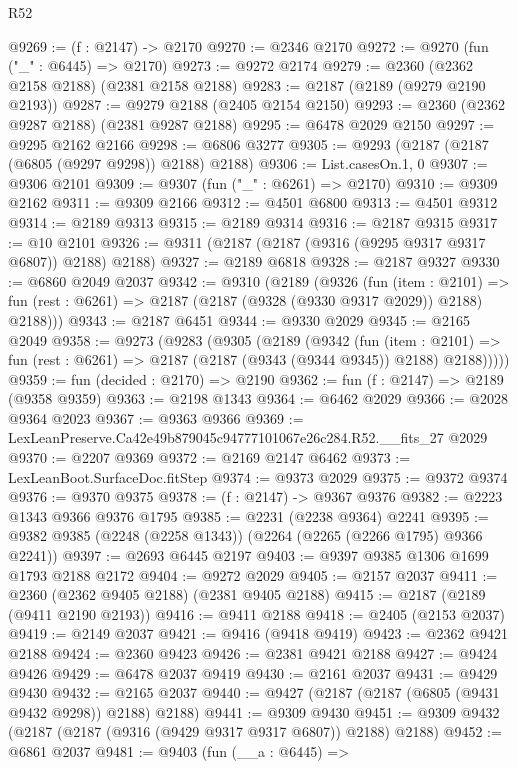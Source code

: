 \begin{lexlean}{R52}
\begin{coremodule}
@9269 := (f : @2147) -> @2170
@9270 := @2346 @2170
@9272 := @9270 (fun ("_" : @6445) => @2170)
@9273 := @9272 @2174
@9279 := @2360 (@2362 @2158 @2188) (@2381 @2158 @2188)
@9283 := @2187 (@2189 (@9279 @2190 @2193))
@9287 := @9279 @2188 (@2405 @2154 @2150)
@9293 := @2360 (@2362 @9287 @2188) (@2381 @9287 @2188)
@9295 := @6478 @2029 @2150
@9297 := @9295 @2162 @2166
@9298 := @6806 @3277
@9305 := @9293 (@2187 (@2187 (@6805 (@9297 @9298)) @2188) @2188)
@9306 := List.casesOn.{1, 0}
@9307 := @9306 @2101
@9309 := @9307 (fun ("_" : @6261) => @2170)
@9310 := @9309 @2162
@9311 := @9309 @2166
@9312 := @4501 @6800
@9313 := @4501 @9312
@9314 := @2189 @9313
@9315 := @2189 @9314
@9316 := @2187 @9315
@9317 := @10 @2101
@9326 := @9311 (@2187 (@2187 (@9316 (@9295 @9317 @9317 @6807)) @2188) @2188)
@9327 := @2189 @6818
@9328 := @2187 @9327
@9330 := @6860 @2049 @2037
@9342 := @9310
    (@2189
      (@9326
        (fun (item : @2101) =>
        fun (rest : @6261) => @2187 (@2187 (@9328 (@9330 @9317 @2029)) @2188) @2188)))
@9343 := @2187 @6451
@9344 := @9330 @2029
@9345 := @2165 @2049
@9358 := @9273
    (@9283
      (@9305
        (@2189
          (@9342
            (fun (item : @2101) =>
            fun (rest : @6261) => @2187 (@2187 (@9343 (@9344 @9345)) @2188) @2188)))))
@9359 := fun (decided : @2170) => @2190
@9362 := fun (f : @2147) => @2189 (@9358 @9359)
@9363 := @2198 @1343
@9364 := @6462 @2029
@9366 := @2028 @9364 @2023
@9367 := @9363 @9366
@9369 := LexLeanPreserve.Ca42e49b879045c94777101067e26c284.R52.__fits_27 @2029
@9370 := @2207 @9369
@9372 := @2169 @2147 @6462
@9373 := LexLeanBoot.SurfaceDoc.fitStep
@9374 := @9373 @2029
@9375 := @9372 @9374
@9376 := @9370 @9375
@9378 := (f : @2147) -> @9367 @9376
@9382 := @2223 @1343 @9366 @9376 @1795
@9385 := @2231 (@2238 @9364) @2241
@9395 := @9382 @9385 (@2248 (@2258 @1343)) (@2264 (@2265 (@2266 @1795) @9366 @2241))
@9397 := @2693 @6445 @2197
@9403 := @9397 @9385 @1306 @1699 @1793 @2188 @2172
@9404 := @9272 @2029
@9405 := @2157 @2037
@9411 := @2360 (@2362 @9405 @2188) (@2381 @9405 @2188)
@9415 := @2187 (@2189 (@9411 @2190 @2193))
@9416 := @9411 @2188
@9418 := @2405 (@2153 @2037)
@9419 := @2149 @2037
@9421 := @9416 (@9418 @9419)
@9423 := @2362 @9421 @2188
@9424 := @2360 @9423
@9426 := @2381 @9421 @2188
@9427 := @9424 @9426
@9429 := @6478 @2037 @9419
@9430 := @2161 @2037
@9431 := @9429 @9430
@9432 := @2165 @2037
@9440 := @9427 (@2187 (@2187 (@6805 (@9431 @9432 @9298)) @2188) @2188)
@9441 := @9309 @9430
@9451 := @9309 @9432 (@2187 (@2187 (@9316 (@9429 @9317 @9317 @6807)) @2188) @2188)
@9452 := @6861 @2037
@9481 := @9403
    (fun (__a : @6445) =>

\end{coremodule}
\end{lexlean}
